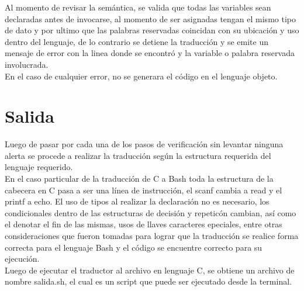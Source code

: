 \documentclass[aspectratio=169]{article}
\begin{document}
	Al momento de revisar la semántica, se valida que todas las variables sean declaradas antes de invocarse, al momento de ser asignadas tengan el mismo tipo de dato y por ultimo que las palabras reservadas coincidan con su ubicación y uso dentro del lenguaje, de lo contrario se detiene la traducción y se emite un mensaje de error con la linea donde se encontró y la variable o palabra reservada involucrada.\\
	
	En el caso de cualquier error, no se generara el código en el lenguaje objeto.

\section{Salida}

	Luego de pasar por cada una de los pasos de verificación sin levantar ninguna alerta se procede a realizar la traducción según la estructura requerida del lenguaje requerido.\\

	En el caso particular de la traducci\'on de C a Bash toda la estructura de la cabecera en C pasa a ser una línea de instrucci\'on, el scanf  cambia a read y el printf a echo. El uso de tipos al realizar la declaraci\'on no es necesario, los condicionales dentro de las estructuras de decisi\'on y repetic\'on cambian, así como el denotar el fin de las mismas, usos de llaves caracteres epeciales, entre otras consideraciones que fueron tomadas para lograr que la traducci\'on se realice forma correcta para el lenguaje Bash y el c\'odigo se encuentre correcto para su ejecuci\'on.\\

	Luego de ejecutar el traductor al archivo en lenguaje C, se obtiene un archivo de nombre salida.sh, el cual es un script que puede ser ejecutado desde la terminal.
\end{document}
